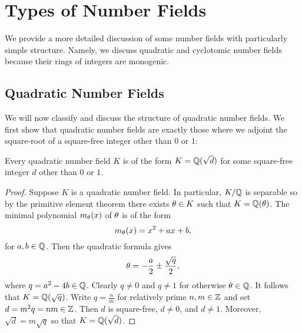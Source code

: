 \chapter{Types of Number Fields}
  We provide a more detailed discussion of some number fields with particularly simple structure. Namely, we discuss quadratic and cyclotomic number fields because their rings of integers are monogenic.
  \section{Quadratic Number Fields}
    We will now classify and discuss the structure of quadratic number fields. We first show that quadratic number fields are exactly those where we adjoint the square-root of a square-free integer other than $0$ or $1$:

    \begin{proposition}\label{prop:classification_of_quadratic_number_fields}
      Every quadratic number field $K$ is of the form $K = \mathbb{Q}(\sqrt{d})$ for some square-free integer $d$ other than $0$ or $1$.
    \end{proposition}
    \begin{proof}
      Suppose $K$ is a quadratic number field. In particular, $K/\mathbb{Q}$ is separable so by the primitive element theorem there exists $\theta \in K$ such that $K = \mathbb{Q}(\theta)$. The minimal polynomial $m_{\theta}(x)$ of $\theta$ is of the form
      \[
        m_{\theta}(x) = x^{2}+ax+b,
      \]
      for $a,b \in \mathbb{Q}$. Then the quadratic formula gives
      \[
        \theta = -\frac{a}{2}\pm\frac{\sqrt{q}}{2},
      \]
      where $q = a^{2}-4b \in \mathbb{Q}$. Clearly $q \neq 0$ and $q \neq 1$ for otherwise $\theta \in \mathbb{Q}$. It follows that $K = \mathbb{Q}(\sqrt{q})$. Write $q = \frac{n}{m}$ for relatively prime $n,m \in \mathbb{Z}$ and set $d = m^{2}q = nm \in \mathbb{Z}$. Then $d$ is square-free, $d \neq 0$, and $d \neq 1$. Moreover, $\sqrt{d} = m\sqrt{q}$ so that $K = \mathbb{Q}(\sqrt{d})$. 
    \end{proof}


